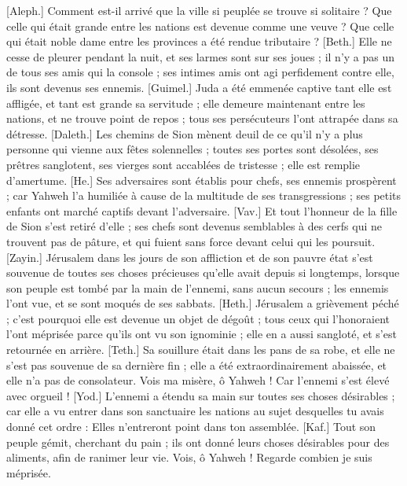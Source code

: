 \begin{multicols}{2}
\VerseOne{}[Aleph.] Comment est-il arrivé que la ville si peuplée se trouve si solitaire ? Que celle qui était grande entre les nations est devenue comme une veuve ? Que celle qui était noble dame entre les provinces a été rendue tributaire ?
[Beth.] Elle ne cesse de pleurer pendant la nuit, et ses larmes sont sur ses joues ; il n'y a pas un de tous ses amis qui la console ; ses intimes amis ont agi perfidement contre elle, ils sont devenus ses ennemis.
[Guimel.] Juda a été emmenée captive tant elle est affligée, et tant est grande sa servitude ; elle demeure maintenant entre les nations, et ne trouve point de repos ; tous ses persécuteurs l'ont attrapée dans sa détresse.
[Daleth.] Les chemins de Sion mènent deuil de ce qu'il n'y a plus personne qui vienne aux fêtes solennelles ; toutes ses portes sont désolées, ses prêtres sanglotent, ses vierges sont accablées de tristesse ; elle est remplie d'amertume. 
[He.] Ses adversaires sont établis pour chefs, ses ennemis prospèrent ; car Yahweh l'a humiliée à cause de la multitude de ses transgressions ; ses petits enfants ont marché captifs devant l'adversaire.
[Vav.] Et tout l'honneur de la fille de Sion s'est retiré d'elle ; ses chefs sont devenus semblables à des cerfs qui ne trouvent pas de pâture, et qui fuient sans force devant celui qui les poursuit.
[Zayin.] Jérusalem dans les jours de son affliction et de son pauvre état s'est souvenue de toutes ses choses précieuses qu'elle avait depuis si longtemps, lorsque son peuple est tombé par la main de l'ennemi, sans aucun secours ; les ennemis l'ont vue, et se sont moqués de ses sabbats.
[Heth.] Jérusalem a grièvement péché ; c'est pourquoi elle est devenue un objet de dégoût ; tous ceux qui l'honoraient l'ont méprisée parce qu'ils ont vu son ignominie ; elle en a aussi sangloté, et s'est retournée en arrière.
[Teth.] Sa souillure était dans les pans de sa robe, et elle ne s'est pas souvenue de sa dernière fin ; elle a été extraordinairement abaissée, et elle n'a pas de consolateur. Vois ma misère, ô Yahweh ! Car l'ennemi s'est élevé avec orgueil !
[Yod.] L'ennemi a étendu sa main sur toutes ses choses désirables ; car elle a vu entrer dans son sanctuaire les nations au sujet desquelles tu avais donné cet ordre : Elles n'entreront point dans ton assemblée.
[Kaf.] Tout son peuple gémit, cherchant du pain ; ils ont donné leurs choses désirables pour des aliments, afin de ranimer leur vie. Vois, ô Yahweh ! Regarde combien je suis méprisée.

\end{multicols}
